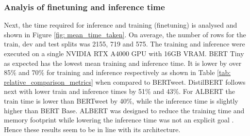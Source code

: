 \subsubsection{Analyis of finetuning and inference time}

Next, the time required for inference and training (finetuning) is analysed and shown in Figure \ref{fig: mean_time_taken}. On average, the number of rows for the train, dev and test splits was 2155, 719 and 575. The training and inference were executed on a single NVIDIA RTX A4000 GPU with 16GB VRAM. BERT Tiny as expected has the lowest mean training and inference time. It is lower by over 85\% and 70\% for training and inference respectively as shown in Table \ref{tab: relative_comparison_metrics} when compared to BERTweet. DistilBERT follows next with lower train and inference times by 51\% and 43\%. For ALBERT the train time is lower than BERTweet by 40\%, while the inference time is slightly higher than BERT Base. ALBERT was designed to reduce the training time and memory footprint while lowering the inference time was not an explicit goal \cite{lanALBERTLiteBERT2020}. Hence these results seem to be in line with its architecture. 
